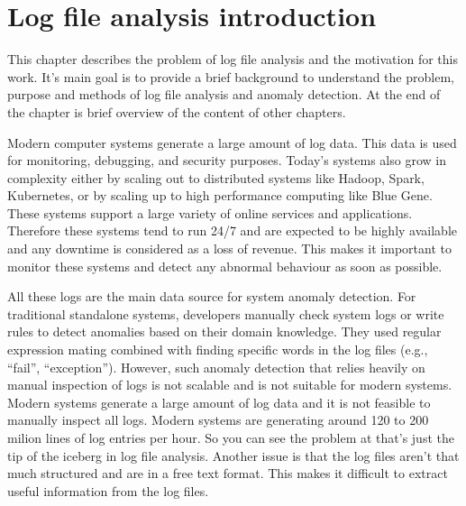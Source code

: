 
% 

\chapter{Log file analysis introduction}

This chapter describes the problem of log file analysis and the motivation for this work. It's main goal is to provide a brief background to understand the problem, purpose and methods of log file 
analysis and anomaly detection. At the end of the chapter is brief overview of the content of other chapters.

Modern computer systems generate a large amount of log data. This data is used for monitoring, debugging, and security purposes. Today's systems also grow in complexity either by 
scaling out to distributed systems like Hadoop, Spark, Kubernetes, or by scaling up to high performance computing like Blue Gene. These systems support a large variety of online services and applications.
Therefore these systems tend to run 24/7 and are expected to be highly available and any downtime is considered as a loss of revenue. This makes it important to monitor these systems and detect any abnormal 
behaviour as soon as possible.

All these logs are the main data source for system anomaly detection. For traditional standalone systems, developers manually check system logs or write rules to detect anomalies 
based on their domain knowledge. They used regular expression mating combined with finding specific words in the log files (e.g., “fail”, “exception”). However, such anomaly detection that relies heavily on
manual inspection of logs is not scalable and is not suitable for modern systems. Modern systems generate a large amount of log data and it is not feasible to manually inspect all logs. Modern systems 
are generating around 120 to 200 milion lines of log entries per hour. So you can see the problem at that's just the tip of the iceberg in log file analysis. Another issue is that the log files aren't 
that much structured and are in a free text format. This makes it difficult to extract useful information from the log files.

